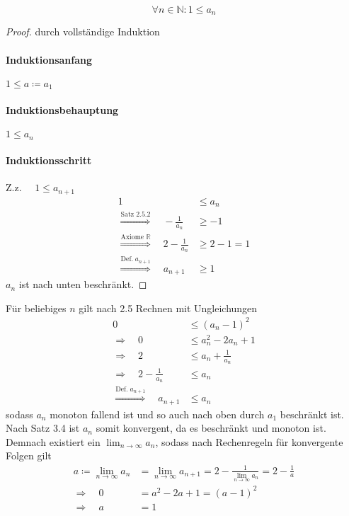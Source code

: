 \documentclass[a4paper, 12pt]{scrartcl}
\newcommand{\defimpl}[1]{\stackrel{\text{Def.}\;#1}{\Longrightarrow}}
\newcommand{\txtimpl}[1]{\stackrel{\text{#1}}{\Longrightarrow}}
\begin{document}
\begin{theorem}
	\[ \forall n \in \mathbb{N}: 1 \leq a_n \]
\end{theorem}
\begin{proof} durch vollständige Induktion
\paragraph*{Induktionsanfang} $1 \leq a \coloneqq a_1$
\paragraph*{Induktionsbehauptung} $1 \leq a_n$
\paragraph*{Induktionsschritt} Z.z. $\quad 1 \leq a_{n+1}$
\begin{align*}
	1 &\leq a_n \\
	\txtimpl{Satz 2.5.2}\quad -\frac{1}{a_n} &\geq -1 \\
	\txtimpl{Axiome $\mathbb{R}$} \quad 2 - \frac{1}{a_n} &\geq 2 - 1 = 1 \\
	\defimpl{a_{n+1}} \quad a_{n+1} &\geq 1
\end{align*}
$a_n$ ist nach unten beschränkt.
\end{proof}
Für beliebiges $n$ gilt nach 2.5 Rechnen mit Ungleichungen
\begin{align*}
	0 &\leq (a_n - 1)^2 \\
	\Rightarrow \quad 0 &\leq a_n^2 - 2a_n + 1 \\
	\Rightarrow \quad 2 &\leq a_n + \frac{1}{a_n} \\
	\Rightarrow \quad 2 - \frac{1}{a_n} &\leq a_n \\
	\defimpl{a_{n+1}}\quad a_{n+1} &\leq a_n
\end{align*}
sodass $a_n$ monoton fallend ist und so auch nach oben durch $a_1$ beschränkt ist. Nach Satz 3.4 ist $a_n$ somit konvergent, da es beschränkt und monoton ist. Demnach existiert ein $\lim_{n \rightarrow \infty} a_n$, sodass nach Rechenregeln für konvergente Folgen gilt
\begin{align*}
	a \coloneqq \lim_{n \rightarrow \infty} a_n &= \lim_{n \rightarrow \infty} a_{n+1} = 2 - \frac{1}{\lim_{n \rightarrow \infty} a_n} = 2 - \frac{1}{a} \\
	\Rightarrow \quad 0 &= a^2 - 2a + 1 = (a-1)^2 \\
	\Rightarrow \quad a &= 1
\end{align*}
\end{document}
